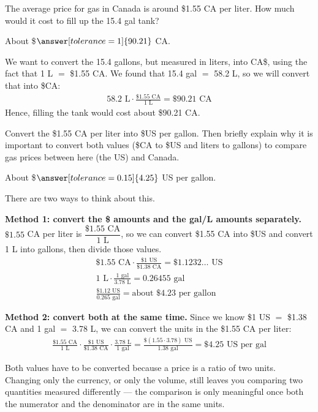 \documentclass[12pt]{ximera}
\begin{document}
\begin{problem}
The average price for gas in Canada is around \$1.55 CA per liter. How much would it
cost to fill up the 15.4 gal tank?

About \$$\answer[tolerance=1]{90.21}$ CA.

\begin{solution}
We want to convert the 15.4 gallons, but measured in liters, into CA\$, using the fact
that 1 L $=$ \$1.55 CA. We found that 15.4 gal $=$ 58.2 L, so we will convert that into
\$CA:
\begin{gather*}
58.2\text{ L} \cdot \frac{\$1.55\text{ CA}}{1\text{ L}} = \$90.21\text{ CA}
\end{gather*}
Hence, filling the tank would cost about \$90.21 CA.
\end{solution}
\end{problem}

\begin{problem}
Convert the \$1.55 CA per liter into \$US per gallon. Then briefly explain why it is
important to convert both values (\$CA to \$US and liters to gallons) to compare gas
prices between here (the US) and Canada.

About \$$\answer[tolerance=0.15]{4.25}$ US per gallon.

\begin{freeResponse}
\end{freeResponse}

\begin{solution}
There are two ways to think about this.

\textbf{Method 1: convert the \$ amounts and the gal/L amounts separately.}
$\$1.55$ CA per liter is $\dfrac{\$1.55\text{ CA}}{1\text{ L}}$, so we can convert
\$1.55 CA into \$US and convert 1 L into gallons, then divide those values.
\begin{gather*}
\$1.55\text{ CA} \cdot \frac{\$1\text{ US}}{\$1.38\text{ CA}} = \$1.1232\ldots\text{ US} \\
1\text{ L} \cdot \frac{1\text{ gal}}{3.78\text{ L}} = 0.26455\text{ gal} \\
\frac{\$1.12\text{ US}}{0.265\text{ gal}} = \text{about } \$4.23\text{ per gallon}
\end{gather*}

\textbf{Method 2: convert both at the same time.} Since we know \$1 US $=$ \$1.38 CA and
1 gal $=$ 3.78 L, we can convert the units in the \$1.55 CA per liter:
\begin{gather*}
\frac{\$1.55\text{ CA}}{1\text{ L}} \cdot \frac{\$1\text{ US}}{\$1.38\text{ CA}} \cdot \frac{3.78\text{ L}}{1\text{ gal}}
= \frac{\$(1.55 \cdot 3.78)\text{ US}}{1.38\text{ gal}} = \$4.25\text{ US per gal}
\end{gather*}

Both values have to be converted because a price is a ratio of two units. Changing only
the currency, or only the volume, still leaves you comparing two quantities measured
differently --- the comparison is only meaningful once both the numerator and the
denominator are in the same units.
\end{solution}
\end{problem}
\end{document}
